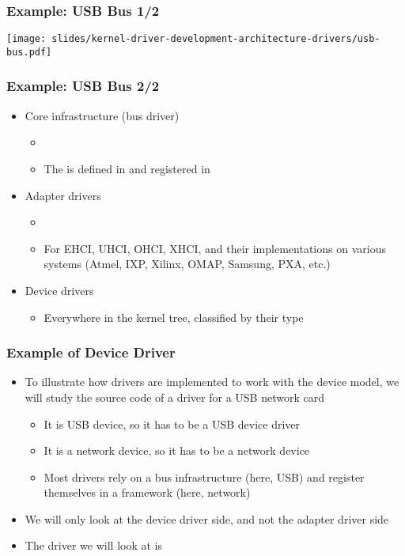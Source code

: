 \begin{frame}
\frametitle{Example: USB Bus 1/2}
  \begin{center}
    \texttt{[image: slides/kernel-driver-development-architecture-drivers/usb-bus.pdf]}
  \end{center}
\end{frame}

\begin{frame}
  \frametitle{Example: USB Bus 2/2}
  \begin{itemize}
  \item Core infrastructure (bus driver)
    \begin{itemize}
    \item {}
    \item The  is defined in
       and registered in
    \end{itemize}
  \item Adapter drivers
    \begin{itemize}
    \item {}
    \item For EHCI, UHCI, OHCI, XHCI, and their implementations on
      various systems (Atmel, IXP, Xilinx, OMAP, Samsung, PXA, etc.)
    \end{itemize}
  \item Device drivers
    \begin{itemize}
    \item Everywhere in the kernel tree, classified by their type
    \end{itemize}
  \end{itemize}
\end{frame}

\begin{frame}
  \frametitle{Example of Device Driver}
  \begin{itemize}
  \item To illustrate how drivers are implemented to work with the
    device model, we will study the source code of a driver for a USB
    network card
    \begin{itemize}
    \item It is USB device, so it has to be a USB device driver
    \item It is a network device, so it has to be a network device
    \item Most drivers rely on a bus infrastructure (here, USB) and
      register themselves in a framework (here, network)
    \end{itemize}
  \item We will only look at the device driver side, and not the
    adapter driver side
  \item The driver we will look at is 
  \end{itemize}
\end{frame}

